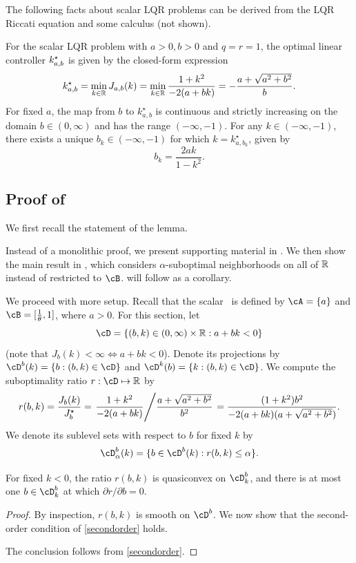 \noindent The following facts about scalar LQR problems can be derived from
the LQR Riccati equation and some calculus (not shown).
\begin{lemma}
\label{lem:scalar-lqr-facts}
For the scalar LQR problem with $a > 0, b > 0$ and $q = r = 1$,
the optimal linear controller $k^\star_{a,b}$ is given by the closed-form expression
	\[
		k^\star_{a,b}
		=
		\min_{k \in \mathbb{R}} J_{a,b}(k)
		=
		\min_{k \in \mathbb{R}} \frac{1 + k^2}{-2(a + bk)}
		=
		-\frac{a + \sqrt{a^2 + b^2}}{b}.
	\]
For fixed $a$, the map from $b$ to $k^\star_{a,b}$
is continuous and strictly increasing on the domain $b \in (0, \infty)$
and has the range $(-\infty, -1)$.
For any $k \in (-\infty, -1)$,
there exists a unique $b_k \in (-\infty, -1)$
for which $k = k^\star_{a,b_k}$, given by
\[
	b_k = \frac{2ak}{1 - k^2}.
\]
\end{lemma}

\newcommand{\bkdomain}{\cD}
\newcommand{\bdomain}{\cD^b}
\newcommand{\kdomain}{\cD^k}

\subsection{Proof of }

We first recall the statement of the lemma.
\quasi*

\noindent Instead of a monolithic proof,
we present supporting material in .
We then show the main result in ,
which considers $\alpha$-suboptimal neighborhoods on all of $\mathbb{R}$
instead of restricted to $\cB$.
 will follow as a corollary.

We proceed with more setup.
Recall that the scalar \DDFproblem\ is defined by
$\cA = \{a\}$ and $\cB = [\recip \theta, 1]$, where $a > 0$.
For this section,
let
\[
	\bkdomain
	= \{ (b, k) \in (0, \infty) \times \R : a + bk < 0 \}
\]
(note that $J_b(k) < \infty \iff a + bk < 0$).
Denote its projections by
$\bdomain(k) = \{ b: (b, k) \in \bkdomain \}$
and
$\kdomain(b) = \{ k: (b, k) \in \bkdomain \}$.
We compute the suboptimality ratio $r : \bkdomain \mapsto \R$ by
\[
	r(b, k) =
	\frac{J_b(k)}{J^\star_b}
	=
	\left. 
		\frac{
			1 + k^2
		}{
			-2(a + bk)
		}
	 \middle/ 
		\frac{
			a + \sqrt{a^2 + b^2}
		}{
			b^2
		}
	 \right.
	=
	\frac{
		(1 + k^2) b^2
	}{
		-2(a + bk)(a + \sqrt{a^2 + b^2})
	}.
\]
We denote its sublevel sets with respect to $b$ for fixed $k$ by
\[
	\bdomain_\alpha(k) = \{ b \in \bdomain(k) : r(b, k) \leq \alpha \}.
\]
\begin{lemma}
\label{lem:ratio-quasi}
	For fixed $k < 0$, the ratio $r(b, k)$ is quasiconvex on $\bdomain_k$,
	and there is at most one $b \in \bdomain_k$ at which $\partial r / \partial b = 0$.
\end{lemma}
\begin{proof}
	By inspection, $r(b, k)$ is smooth on $\bdomain$.
	We now show that the second-order condition of \ref{secondorder} holds.
	
	The conclusion follows from \ref{secondorder}.
\end{proof}

